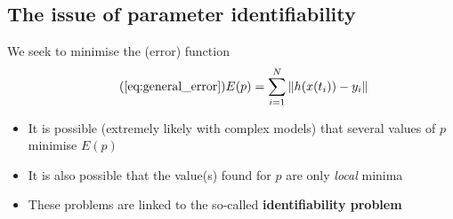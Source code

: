 \documentclass[aspectratio=43]{beamer}
\begin{document}

\subsection{The issue of parameter identifiability}

\begin{frame}{}
    We seek to minimise the (error) function
    \begin{equation}\tag{\ref{eq:general_error}}
        E(p) = \sum_{i=1}^N \|h(x(t_i))-y_i\|
    \end{equation}
    \vfill
    \begin{itemize}
        \item It is possible (extremely likely with complex models) that several values of $p$ minimise $E(p)$
        \item It is also possible that the value(s) found for $p$ are only \emph{local} minima 
        \item These problems are linked to the so-called \textbf{identifiability problem}
    \end{itemize}
\end{frame}
\end{document}
